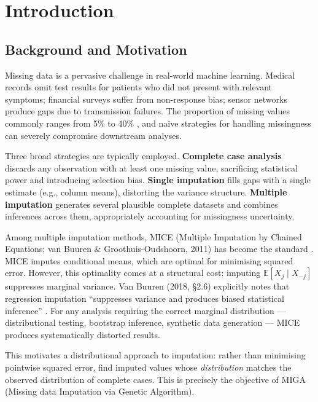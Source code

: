 
\chapter{Introduction}
\label{Chapter1}

\section{Background and Motivation}

Missing data is a pervasive challenge in real-world machine learning. Medical records omit test results for patients who did not present with relevant symptoms; financial surveys suffer from non-response bias; sensor networks produce gaps due to transmission failures. The proportion of missing values commonly ranges from 5\% to 40\% \cite{vanBuuren2018}, and naive strategies for handling missingness can severely compromise downstream analyses.

Three broad strategies are typically employed. \textbf{Complete case analysis} discards any observation with at least one missing value, sacrificing statistical power and introducing selection bias. \textbf{Single imputation} fills gaps with a single estimate (e.g., column means), distorting the variance structure. \textbf{Multiple imputation} generates several plausible complete datasets and combines inferences across them, appropriately accounting for missingness uncertainty.

Among multiple imputation methods, MICE (Multiple Imputation by Chained Equations; van Buuren \& Groothuis-Oudshoorn, 2011) has become the standard \cite{vanBuuren2011}. MICE imputes conditional means, which are optimal for minimising squared error. However, this optimality comes at a structural cost: imputing $\mathbb{E}[X_j \mid X_{-j}]$ suppresses marginal variance. Van Buuren (2018, \S2.6) explicitly notes that regression imputation ``suppresses variance and produces biased statistical inference'' \cite{vanBuuren2018}. For any analysis requiring the correct marginal distribution --- distributional testing, bootstrap inference, synthetic data generation --- MICE produces systematically distorted results.

This motivates a distributional approach to imputation: rather than minimising pointwise squared error, find imputed values whose \emph{distribution} matches the observed distribution of complete cases. This is precisely the objective of MIGA (Missing data Imputation via Genetic Algorithm).

